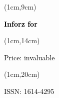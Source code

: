 \begin{titlepage}
    \begin{textblock*}{5cm}(1cm,9cm)
        \begin{rotate}{90}
            \sffamily\huge\textbf{
                \textcolor{black}{Inforz for \ophase}}
        \end{rotate}
    \end{textblock*}


    \begin{textblock*}{2cm}(1cm,14cm)
        \begin{rotate}{90}
            \sffamily\small \textcolor{black}{Price: invaluable}
        \end{rotate}
    \end{textblock*}


    \begin{textblock*}{2cm}(1cm,20cm)
        \begin{rotate}{90}
            \sffamily \textcolor{black}{ISSN: 1614-4295}
        \end{rotate}
    \end{textblock*}

\end{titlepage}
\newpage
